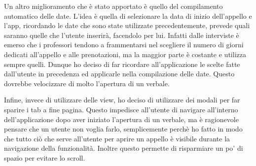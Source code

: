 \documentclass[Lau, oneside, noexaminfo]{sapthesis}%
\begin{document}
Un altro miglioramento che è stato apportato è quello del compilamento automatico delle date. L'idea è quella di selezionare la data di inizio dell'appello e l'app, ricordando le date che sono state utilizzate precedentemente, prevede quali saranno quelle che l'utente inserirà, facendolo per lui. Infatti dalle interviste è emerso che i professori tendono a frammentarsi nel scegliere il numero di giorni dedicati all'appello e alle prenotazioni, ma la maggior parte è costante e utilizza sempre quelli. Dunque ho deciso di far ricordare all'applicazione le scelte fatte dall'utente in precedenza ed applicarle nella compilazione delle date.
Questo dovrebbe velocizzare di molto l'apertura di un verbale. %

Infine, invece di utilizzare delle view, ho deciso di utilizzare dei modali per far sparire i tab a fine pagina. Questo impedisce all'utente di navigare all'interno dell'applicazione dopo aver iniziato l'apertura di un verbale, ma è ragionevole pensare che un utente non voglia farlo, semplicemente perchè ho fatto in modo che tutto ciò che serve all'utente per aprire un appello è visibile durante la navigazione della funzionalità. Inoltre questo permette di risparmiare un po' di spazio per evitare lo scroll.
\end{document}
